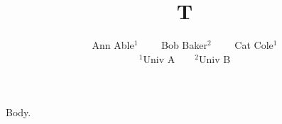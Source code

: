 \documentclass{article}
\title{T}
\author{Ann Able$^1$~~~~ Bob Baker$^2$~~~~ Cat Cole$^1$\\
$^1$Univ A~~~~$^2$Univ B}
\begin{document}
\maketitle
Body.
\end{document}
